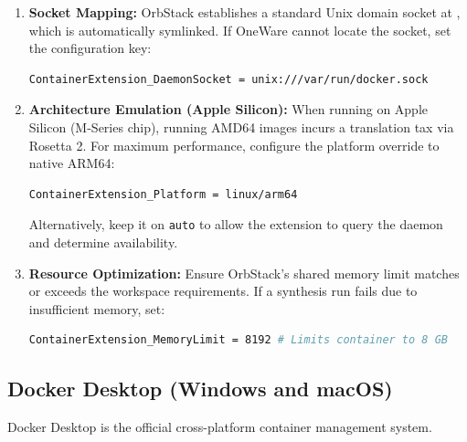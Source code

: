 \begin{enumerate}
    \item \textbf{Socket Mapping:} OrbStack establishes a standard Unix domain socket at , which is automatically symlinked. If OneWare cannot locate the socket, set the configuration key:
    \begin{lstlisting}[language=bash]
ContainerExtension_DaemonSocket = unix:///var/run/docker.sock
\end{lstlisting}
    \item \textbf{Architecture Emulation (Apple Silicon):}
    When running on Apple Silicon (M-Series chip), running AMD64 images incurs a translation tax via Rosetta 2. For maximum performance, configure the platform override to native ARM64:
    \begin{lstlisting}[language=bash]
ContainerExtension_Platform = linux/arm64
\end{lstlisting}
    Alternatively, keep it on \texttt{auto} to allow the extension to query the daemon and determine availability.
    \item \textbf{Resource Optimization:} Ensure OrbStack's shared memory limit matches or exceeds the workspace requirements. If a synthesis run fails due to insufficient memory, set:
    \begin{lstlisting}[language=bash]
ContainerExtension_MemoryLimit = 8192 # Limits container to 8 GB
\end{lstlisting}
\end{enumerate}

\subsection{Docker Desktop (Windows and macOS)}
Docker Desktop is the official cross-platform container management system.

